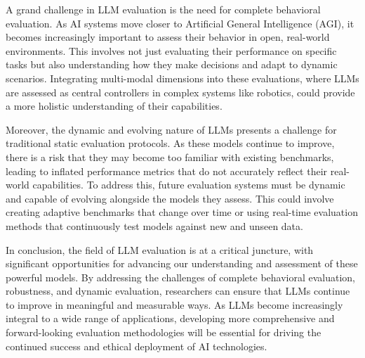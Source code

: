 A grand challenge in LLM evaluation is the need for complete behavioral evaluation. As AI systems move closer to Artificial General Intelligence (AGI), it becomes increasingly important to assess their behavior in open, real-world environments. This involves not just evaluating their performance on specific tasks but also understanding how they make decisions and adapt to dynamic scenarios. Integrating multi-modal dimensions into these evaluations, where LLMs are assessed as central controllers in complex systems like robotics, could provide a more holistic understanding of their capabilities.

Moreover, the dynamic and evolving nature of LLMs presents a challenge for traditional static evaluation protocols. As these models continue to improve, there is a risk that they may become too familiar with existing benchmarks, leading to inflated performance metrics that do not accurately reflect their real-world capabilities. To address this, future evaluation systems must be dynamic and capable of evolving alongside the models they assess. This could involve creating adaptive benchmarks that change over time or using real-time evaluation methods that continuously test models against new and unseen data.

In conclusion, the field of LLM evaluation is at a critical juncture, with significant opportunities for advancing our understanding and assessment of these powerful models. By addressing the challenges of complete behavioral evaluation, robustness, and dynamic evaluation, researchers can ensure that LLMs continue to improve in meaningful and measurable ways. As LLMs become increasingly integral to a wide range of applications, developing more comprehensive and forward-looking evaluation methodologies will be essential for driving the continued success and ethical deployment of AI technologies.
